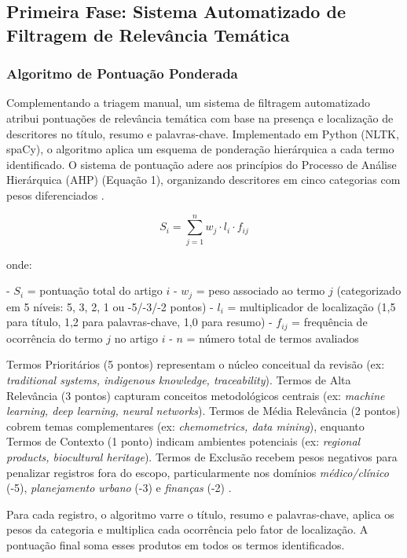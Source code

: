 \subsection{Primeira Fase: Sistema Automatizado de Filtragem de Relevância Temática}

\subsubsection{Algoritmo de Pontuação Ponderada}

Complementando a triagem manual, um sistema de filtragem automatizado atribui pontuações de relevância temática com base na presença e localização de descritores no título, resumo e palavras-chave. Implementado em Python (NLTK, spaCy), o algoritmo aplica um esquema de ponderação hierárquica a cada termo identificado. O sistema de pontuação adere aos princípios do Processo de Análise Hierárquica (AHP) (Equação 1), organizando descritores em cinco categorias com pesos diferenciados  \cite{SAATY1991}.

$$
S_i = \sum_{j=1}^{n} w_j \cdot l_i \cdot f_{ij}
$$

onde:

- $S_i$ = pontuação total do artigo $i$
- $w_j$ = peso associado ao termo $j$ (categorizado em 5 níveis: 5, 3, 2, 1 ou -5/-3/-2 pontos)
- $l_i$ = multiplicador de localização (1,5 para título, 1,2 para palavras-chave, 1,0 para resumo)
- $f_{ij}$ = frequência de ocorrência do termo $j$ no artigo $i$
- $n$ = número total de termos avaliados

Termos Prioritários (5 pontos) representam o núcleo conceitual da revisão (ex: \emph{traditional systems, indigenous knowledge, traceability}). Termos de Alta Relevância (3 pontos) capturam conceitos metodológicos centrais (ex: \emph{machine learning, deep learning, neural networks}). Termos de Média Relevância (2 pontos) cobrem temas complementares (ex: \emph{chemometrics, data mining}), enquanto Termos de Contexto (1 ponto) indicam ambientes potenciais (ex: \emph{regional products, biocultural heritage}). Termos de Exclusão recebem pesos negativos para penalizar registros fora do escopo, particularmente nos domínios \emph{médico/clínico} (-5), \emph{planejamento urbano} (-3) e \emph{finanças} (-2)  \cite{tMUNN2018, ricco2018}.

Para cada registro, o algoritmo varre o título, resumo e palavras-chave, aplica os pesos da categoria e multiplica cada ocorrência pelo fator de localização. A pontuação final soma esses produtos em todos os termos identificados.

